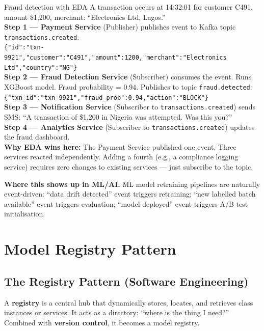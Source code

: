 \documentclass[a4paper,11pt]{article}
\newcommand{\vocab}[1]{\textbf{\color{navy}#1}}
\begin{document}
\begin{worked}{Fraud detection with EDA}
A transaction occurs at 14:32:01 for customer C491, amount \$1,200, merchant: ``Electronics Ltd, Lagos.'' \\[4pt]
\textbf{Step 1 --- Payment Service} (Publisher) publishes event to Kafka topic \texttt{transactions.created}: \\
\texttt{\{"id":"txn-9921","customer":"C491","amount":1200,"merchant":"Electronics Ltd","country":"NG"\}} \\[4pt]
\textbf{Step 2 --- Fraud Detection Service} (Subscriber) consumes the event. Runs XGBoost model. Fraud probability = 0.94. Publishes to topic \texttt{fraud.detected}: \\
\texttt{\{"txn\_id":"txn-9921","fraud\_prob":0.94,"action":"BLOCK"\}} \\[4pt]
\textbf{Step 3 --- Notification Service} (Subscriber to \texttt{transactions.created}) sends SMS: ``A transaction of \$1,200 in Nigeria was attempted. Was this you?'' \\[4pt]
\textbf{Step 4 --- Analytics Service} (Subscriber to \texttt{transactions.created}) updates the fraud dashboard. \\[4pt]
\textbf{Why EDA wins here:} The Payment Service published one event. Three services reacted independently. Adding a fourth (e.g., a compliance logging service) requires zero changes to existing services --- just subscribe to the topic.
\end{worked}

\noindent\textbf{Where this shows up in ML/AI.} ML model retraining pipelines are naturally event-driven: ``data drift detected'' event triggers retraining; ``new labelled batch available'' event triggers evaluation; ``model deployed'' event triggers A/B test initialisation.

\section{Model Registry Pattern}

\subsection{The Registry Pattern (Software Engineering)}

A \vocab{registry} is a central hub that dynamically stores, locates, and retrieves class instances or services. It acts as a directory: ``where is the thing I need?'' Combined with \vocab{version control}, it becomes a model registry.
\end{document}
